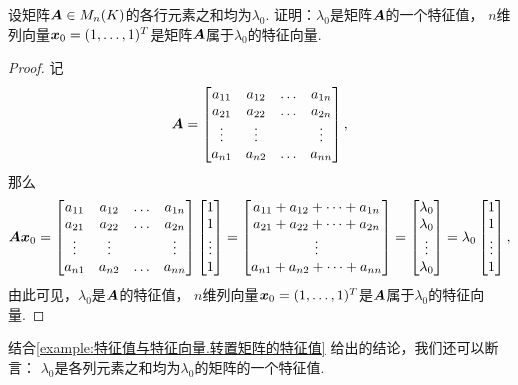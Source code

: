 \begin{example}\label{example:特征值与特征向量.各行元素之和相同的矩阵的特征值与特征向量}
设矩阵\(\boldsymbol{A} \in M_n(K)\)的各行元素之和均为\(\lambda_0\).
证明：\(\lambda_0\)是矩阵\(\boldsymbol{A}\)的一个特征值，
\(n\)维列向量\(\boldsymbol{x}_0=(1,\dotsc,1)^T\)是矩阵\(\boldsymbol{A}\)属于\(\lambda_0\)的特征向量.
\begin{proof}
记\begin{equation*}
	\boldsymbol{A}
	= \begin{bmatrix}
		a_{11} & a_{12} & \dots & a_{1n} \\
		a_{21} & a_{22} & \dots & a_{2n} \\
		\vdots & \vdots & & \vdots \\
		a_{n1} & a_{n2} & \dots & a_{nn}
	\end{bmatrix},
\end{equation*}
那么\begin{equation*}
	\boldsymbol{A} \boldsymbol{x}_0
	= \begin{bmatrix}
		a_{11} & a_{12} & \dots & a_{1n} \\
		a_{21} & a_{22} & \dots & a_{2n} \\
		\vdots & \vdots & & \vdots \\
		a_{n1} & a_{n2} & \dots & a_{nn}
	\end{bmatrix}
	\begin{bmatrix}
		1 \\ 1 \\ \vdots \\ 1
	\end{bmatrix}
	= \begin{bmatrix}
		a_{11} + a_{12} + \dotsb + a_{1n} \\
		a_{21} + a_{22} + \dotsb + a_{2n} \\
		\vdots \\
		a_{n1} + a_{n2} + \dotsb + a_{nn}
	\end{bmatrix}
	= \begin{bmatrix}
		\lambda_0 \\ \lambda_0 \\ \vdots \\ \lambda_0
	\end{bmatrix}
	= \lambda_0
	\begin{bmatrix}
		1 \\ 1 \\ \vdots \\ 1
	\end{bmatrix},
\end{equation*}
由此可见，\(\lambda_0\)是\(\boldsymbol{A}\)的特征值，
\(n\)维列向量\(\boldsymbol{x}_0=(1,\dotsc,1)^T\)是\(\boldsymbol{A}\)属于\(\lambda_0\)的特征向量.
\end{proof}
\end{example}
\begin{remark}
结合\cref{example:特征值与特征向量.转置矩阵的特征值} 给出的结论，我们还可以断言：
\(\lambda_0\)是各列元素之和均为\(\lambda_0\)的矩阵的一个特征值.
\end{remark}

